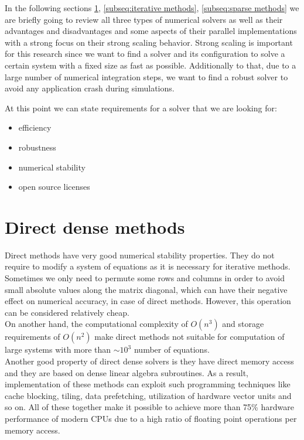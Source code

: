 In the following sections \ref{subseq:direct methods}, \ref{subseq:iterative methods}, \ref{subseq:sparse methods} we are briefly going to review all three types of numerical solvers as well as their advantages and disadvantages and some aspects of their parallel implementations with a strong focus on their strong scaling behavior. Strong scaling is important for this research since we want to find a solver and its configuration to solve a certain system with a fixed size as fast as possible. Additionally to that, due to a large number of numerical integration steps, we want to find a robust solver to avoid any application crash during simulations.

At this point we can state requirements for a solver that we are looking for:

\begin{itemize}
	\item efficiency
	\item robustness
	\item numerical stability
	\item open source licenses
\end{itemize}


\section{Direct dense methods} \label{subseq:direct methods}
Direct methods have very good numerical stability properties. They do not require to modify a system of equations as it is necessary for iterative methods. Sometimes we only need to permute some rows and columns in order to avoid small absolute values along the matrix diagonal, which can have their negative effect on numerical accuracy, in case of direct methods. However, this operation can be considered relatively cheap. \\

On another hand, the computational complexity of $O(n^3)$ and storage requirements of $O(n^2)$ make direct methods not suitable for computation of large systems with more than $\sim 10^3$ number of equations. \\


Another good property of direct dense solvers is they have direct memory access and they are based on dense linear algebra subroutines. As a result, implementation of these methods can exploit such programming techniques like cache blocking, tiling, data prefetching,  utilization of hardware vector units and so on. All of these together make it possible to achieve more than 75\% hardware performance of modern CPUs \cite{articles:blas-performance} due to a high ratio of floating point operations per memory access. \\

